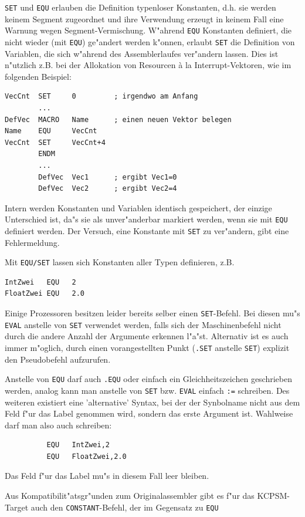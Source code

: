 \documentclass[12pt,a4paper,twoside]{report}
\newcommand{\tty}[1]{{\tt #1}}
\begin{document}
\tty{SET} und \tty{EQU} erlauben die Definition typenloser Konstanten, d.h. sie
werden keinem Segment zugeordnet und ihre Verwendung erzeugt in keinem
Fall eine Warnung wegen Segment-Vermischung.  W"ahrend \tty{EQU} Konstanten
definiert, die nicht wieder (mit \tty{EQU}) ge"andert werden k"onnen, erlaubt
\tty{SET} die Definition von Variablen, die sich w"ahrend des Assemblerlaufes
ver"andern lassen.  Dies ist n"utzlich z.B. bei der Allokation von
Resourcen \`a la Interrupt-Vektoren, wie im folgenden Beispiel:
\begin{verbatim}
VecCnt  SET     0         ; irgendwo am Anfang
        ...
DefVec  MACRO   Name      ; einen neuen Vektor belegen
Name    EQU     VecCnt
VecCnt  SET     VecCnt+4
        ENDM
        ...
        DefVec  Vec1      ; ergibt Vec1=0
        DefVec  Vec2      ; ergibt Vec2=4
\end{verbatim}
Intern werden Konstanten und Variablen identisch gespeichert, der
einzige Unterschied ist, da"s sie als unver"anderbar markiert werden, wenn
sie mit \tty{EQU} definiert werden.  Der Versuch, eine Konstante mit
\tty{SET} zu ver"andern, gibt eine Fehlermeldung.
\par
Mit \tty{EQU/SET} lassen sich Konstanten aller Typen definieren, z.B.
\begin{verbatim}
IntZwei   EQU   2
FloatZwei EQU   2.0
\end{verbatim}
Einige Prozessoren besitzen leider bereits selber einen \tty{SET}-Befehl.
Bei diesen mu"s \tty{EVAL} anstelle von \tty{SET} verwendet werden, falls
sich der Maschinenbefehl nicht durch die andere Anzahl der Argumente 
erkennen l"a"st.  Alternativ ist es auch immer m"oglich, durch einen
vorangestellten Punkt (\tty{.SET} anstelle \tty{SET}) explizit den
Pseudobefehl aufzurufen.
\par
Anstelle von \tty{EQU} darf auch \tty{.EQU} oder einfach ein
Gleichheitszeichen geschrieben werden, analog kann man anstelle
von \tty{SET} bzw. \tty{EVAL} einfach \tty{:=} schreiben.  Des weiteren
existiert eine 'alternative' Syntax, bei der der Synbolname nicht aus dem
Feld f"ur das Label genommen wird, sondern das erste Argument ist.
Wahlweise darf man also auch schreiben:
\begin{verbatim}
          EQU   IntZwei,2
          EQU   FloatZwei,2.0
\end{verbatim}
Das Feld f"ur das Label mu"s in diesem Fall leer bleiben.
\par
Aus Kompatibilit"atsgr"unden zum Originalassembler gibt es f"ur das
KCPSM-Target auch den {\tt CONSTANT}-Befehl, der im Gegensatz zu {\tt EQU}
\end{document}
